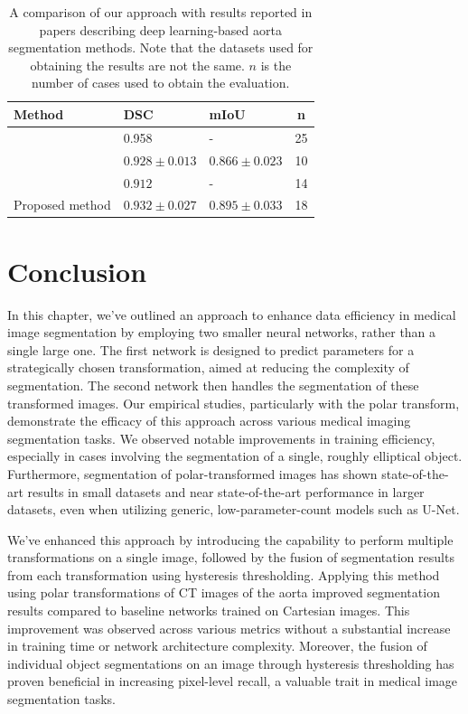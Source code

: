 \begin{table}[h]
\def\arraystretch{1.25}
\centering
\begin{tabularx}{\textwidth}{X l l c}
 \textbf{Method} & \textbf{DSC} & \textbf{mIoU} & \textbf{n}\\ 
 \hline
\citet{yuThreeDimensionalDeepConvolutional2021} & 0.958 & - & 25 \\
\citet{fantazzini3DAutomaticSegmentation2020} & $0.928 \pm 0.013$ & $0.866 \pm 0.023$ & 10 \\
\citet{cheungComputationallyEfficientApproach2021} & $0.912$ & - & 14 \\
Proposed method & $0.932 \pm 0.027$ & $0.895 \pm 0.033$ & 18 \\
\end{tabularx}
\caption{A comparison of our approach with results reported in papers describing deep learning-based aorta segmentation methods. Note that the datasets used for obtaining the results are not the same. $n$ is the number of cases used to obtain the evaluation.}
\label{table:comparison}
\end{table}

\pagebreak


  \section{Conclusion}
    
In this chapter, we've outlined an approach to enhance data efficiency in medical image segmentation by employing two smaller neural networks, rather than a single large one. The first network is designed to predict parameters for a strategically chosen transformation, aimed at reducing the complexity of segmentation. The second network then handles the segmentation of these transformed images. Our empirical studies, particularly with the polar transform, demonstrate the efficacy of this approach across various medical imaging segmentation tasks. We observed notable improvements in training efficiency, especially in cases involving the segmentation of a single, roughly elliptical object. Furthermore, segmentation of polar-transformed images has shown state-of-the-art results in small datasets and near state-of-the-art performance in larger datasets, even when utilizing generic, low-parameter-count models such as U-Net.

We've enhanced this approach by introducing the capability to perform multiple transformations on a single image, followed by the fusion of segmentation results from each transformation using hysteresis thresholding. Applying this method using polar transformations of CT images of the aorta improved segmentation results compared to baseline networks trained on Cartesian images. This improvement was observed across various metrics without a substantial increase in training time or network architecture complexity. Moreover, the fusion of individual object segmentations on an image through hysteresis thresholding has proven beneficial in increasing pixel-level recall, a valuable trait in medical image segmentation tasks.

